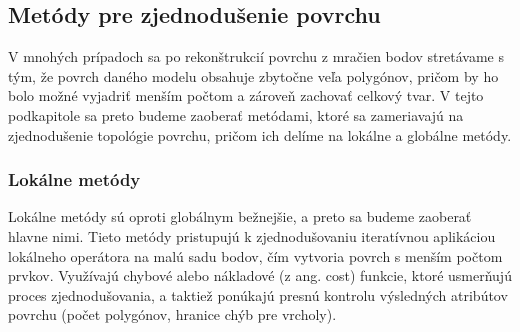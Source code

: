 \subsection{Metódy pre zjednodušenie povrchu}
\noindent V mnohých prípadoch sa po rekonštrukcií povrchu z mračien bodov stretávame s tým, že povrch daného modelu obsahuje zbytočne veľa polygónov, pričom by ho bolo možné vyjadriť menším počtom a zároveň zachovať celkový tvar. V tejto podkapitole sa preto budeme zaoberať metódami, ktoré sa zameriavajú na zjednodušenie topológie povrchu, pričom ich delíme na lokálne a globálne metódy.  

\subsubsection{Lokálne metódy} \label{sec:decimation}
\noindent Lokálne metódy sú oproti globálnym bežnejšie, a preto sa budeme zaoberať hlavne nimi. Tieto metódy pristupujú k zjednodušovaniu iteratívnou aplikáciou lokálneho operátora na malú sadu bodov, čím vytvoria povrch s menším počtom prvkov. Využívajú chybové alebo nákladové (z ang. cost) funkcie, ktoré usmerňujú proces zjednodušovania, a taktiež ponúkajú presnú kontrolu výsledných atribútov povrchu (počet polygónov, hranice chýb pre vrcholy). \cite{mesh_simplification}
